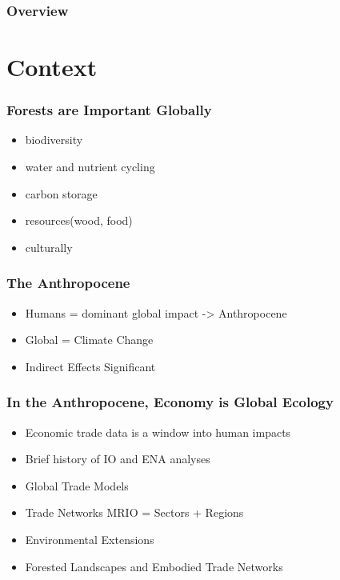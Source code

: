 

\begin{frame}
  \frametitle{Overview}

\tableofcontents


\end{frame}


\section{Context}

\begin{frame}
  \frametitle{Forests are Important Globally}

  \begin{itemize}
  \item biodiversity
  \item water and nutrient cycling
  \item carbon storage
  \item resources(wood, food)
  \item culturally
  \end{itemize}

\end{frame}

\begin{frame}
  \frametitle{The Anthropocene}


  \begin{itemize}
  \item Humans = dominant global impact -> Anthropocene
  \item Global = Climate Change
  \item Indirect Effects Significant
  \end{itemize}


\end{frame}

\begin{frame}
  \frametitle{In the Anthropocene, Economy is Global Ecology}

  \begin{itemize}
  \item Economic trade data is a window into human impacts
  \item Brief history of IO and ENA analyses
  \item Global Trade Models
  \item Trade Networks MRIO = Sectors + Regions
  \item Environmental Extensions
  \item Forested Landscapes and Embodied Trade Networks
  \end{itemize}

\end{frame}

